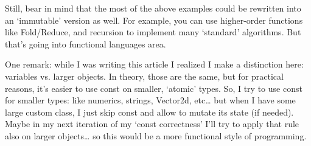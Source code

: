 Still, bear in mind that the most of the above examples could be rewritten into an ‘immutable’ version as well. For example, you can use higher-order functions like Fold/Reduce, and recursion to implement many ‘standard’ algorithms. But that’s going into functional languages area.

One remark: while I was writing this article I realized I make a distinction here: variables vs. larger objects. In theory, those are the same, but for practical reasons, it’s easier to use const on smaller, ‘atomic’ types. So, I try to use const for smaller types: like numerics, strings, Vector2d, etc… but when I have some large custom class, I just skip const and allow to mutate its state (if needed). Maybe in my next iteration of my ‘const correctness’ I’ll try to apply that rule also on larger objects… so this would be a more functional style of programming.